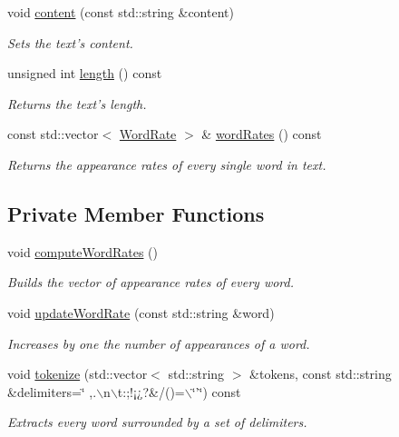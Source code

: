 \begin{CompactItemize}
void \hyperlink{class_text_eca454f28010b6b3e7bd0d771b8eaeb2}{content} (const std::string \&content)
\begin{CompactList}\small\item\em Sets the text's content. \item\end{CompactList}\item 
unsigned int \hyperlink{class_text_8d76db538f8617fb8880ba3e4ff3e6a5}{length} () const 
\begin{CompactList}\small\item\em Returns the text's length. \item\end{CompactList}\item 
const std::vector$<$ \hyperlink{_word_rate_8hpp_6820e401b512f1cdb3f95171db9c67b9}{WordRate} $>$ \& \hyperlink{class_text_46d23c2236172369e2dc57a4baf10f6c}{wordRates} () const 
\begin{CompactList}\small\item\em Returns the appearance rates of every single word in text. \item\end{CompactList}\end{CompactItemize}
\subsection*{Private Member Functions}
\begin{CompactItemize}
\item 
void \hyperlink{class_text_8239e13039bcc1c713f66f1236693706}{computeWordRates} ()
\begin{CompactList}\small\item\em Builds the vector of appearance rates of every word. \item\end{CompactList}\item 
void \hyperlink{class_text_5ab8f9bfa566de537a167991fe10eff5}{updateWordRate} (const std::string \&word)
\begin{CompactList}\small\item\em Increases by one the number of appearances of a word. \item\end{CompactList}\item 
void \hyperlink{class_text_6b26c004c1cac61015f7d49c364a007d}{tokenize} (std::vector$<$ std::string $>$ \&tokens, const std::string \&delimiters=\char`\"{} ,.$\backslash$n$\backslash$t:;!¡¿?\&/()=$\backslash$\char`\"{}'\char`\"{}) const 
\begin{CompactList}\small\item\em Extracts every word surrounded by a set of delimiters. \item\end{CompactList}\end{CompactItemize}

